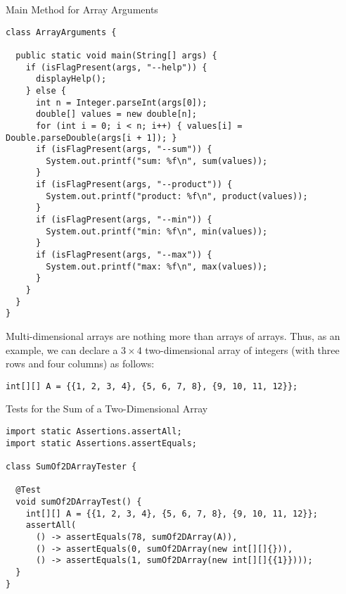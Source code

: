 \begin{cl}{Main Method for Array Arguments}
\begin{lstlisting}[language=MyJava]
class ArrayArguments {

  public static void main(String[] args) {
    if (isFlagPresent(args, "--help")) {
      displayHelp();
    } else {
      int n = Integer.parseInt(args[0]);
      double[] values = new double[n];
      for (int i = 0; i < n; i++) { values[i] = Double.parseDouble(args[i + 1]); }
      if (isFlagPresent(args, "--sum")) { 
        System.out.printf("sum: %f\n", sum(values)); 
      }
      if (isFlagPresent(args, "--product")) { 
        System.out.printf("product: %f\n", product(values)); 
      }
      if (isFlagPresent(args, "--min")) { 
        System.out.printf("min: %f\n", min(values)); 
      }
      if (isFlagPresent(args, "--max")) { 
        System.out.printf("max: %f\n", max(values)); 
      }
    }
  }
}
\end{lstlisting}
\end{cl}


Multi-dimensional arrays are nothing more than arrays of arrays. Thus, as an example, we can declare a $3 \times 4$ two-dimensional array of integers (with three rows and four columns) as follows:
\par{
\begin{verbatim}
int[][] A = {{1, 2, 3, 4}, {5, 6, 7, 8}, {9, 10, 11, 12}};
\end{verbatim}
}

\begin{cl}{Tests for the Sum of a Two-Dimensional Array}
\begin{lstlisting}[language=MyJava]
import static Assertions.assertAll;
import static Assertions.assertEquals;

class SumOf2DArrayTester {

  @Test
  void sumOf2DArrayTest() {
    int[][] A = {{1, 2, 3, 4}, {5, 6, 7, 8}, {9, 10, 11, 12}};
    assertAll(
      () -> assertEquals(78, sumOf2DArray(A)),
      () -> assertEquals(0, sumOf2DArray(new int[][]{})),
      () -> assertEquals(1, sumOf2DArray(new int[][]{{1}})));
  }
}
\end{lstlisting}
\end{cl}

